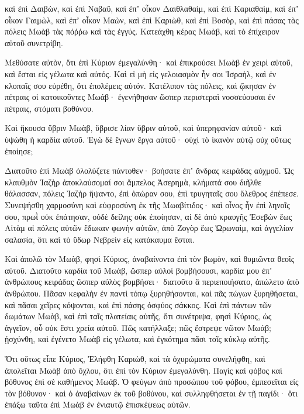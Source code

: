 {καὶ ἐπὶ Δαιβὼν, καὶ ἐπὶ Ναβαῦ, καὶ ἐπʼ οἶκον Δαιθλαθαὶμ,
καὶ ἐπὶ Καριαθαὶμ, καὶ ἐπʼ οἶκον Γαιμὼλ, καὶ ἐπʼ οἶκον Μαὼν,
καὶ ἐπὶ Καριὼθ, καὶ ἐπὶ Βοσὸρ, καὶ ἐπὶ πάσας τὰς πόλεις Μωὰβ τὰς πόῤῥω καὶ τὰς ἐγγύς.
Κατεάχθη κέρας Μωὰβ, καὶ τὸ ἐπίχειρον αὐτοῦ συνετρίβη.
\par }{\PP {}Μεθύσατε αὐτὸν, ὅτι ἐπὶ Κύριον ἐμεγαλύνθη· καὶ ἐπικρούσει Μωὰβ ἐν χειρὶ αὐτοῦ, καὶ ἔσται εἰς γέλωτα καὶ αὐτός.
Καὶ εἰ μὴ εἰς γελοιασμὸν ἦν σοι Ἰσραὴλ, καὶ ἐν κλοπαῖς σου εὑρέθη, ὅτι ἐπολέμεις αὐτόν.
Κατέλιπον τὰς πόλεις, καὶ ᾤκησαν ἐν πέτραις οἱ κατοικοῦντες Μωάβ· ἐγενήθησαν ὥσπερ περιστεραὶ νοσσεύουσαι ἐν πέτραις, στόματι βοθύνου.
\par }{\PP {}Καὶ ἤκουσα ὕβριν Μωὰβ, ὕβρισε λίαν ὕβριν αὐτοῦ, καὶ ὑπερηφανίαν αὐτοῦ· καὶ ὑψώθη ἡ καρδία αὐτοῦ.
Ἐγὼ δὲ ἔγνων ἔργα αὐτοῦ· οὐχὶ τὸ ἱκανὸν αὐτῷ οὐχ οὕτως ἐποίησε;
\par }{\PP {}Διατοῦτο ἐπὶ Μωὰβ ὀλολύζετε πάντοθεν· βοήσατε ἐπʼ ἄνδρας κειράδας αὐχμοῦ.
Ὡς κλαυθμὸν Ἰαζὴρ ἀποκλαύσομαί σοι ἄμπελος Ἀσερημὰ, κλήματά σου διῆλθε θάλασσαν, πόλεις Ἰαζὴρ ἥψαντο, ἐπὶ ὀπώραν σου, ἐπὶ τρυγηταῖς σου ὄλεθρος ἐπέπεσε.
Συνεψήσθη χαρμοσύνη καὶ εὐφροσύνη ἐκ τῆς Μωαβίτιδος· καὶ οἶνος ἦν ἐπὶ ληνοῖς σου, πρωῒ οὐκ ἐπάτησαν, οὐδὲ δείλης οὐκ ἐποίησαν,
αἱ δὲ ἀπὸ κραυγῆς Ἐσεβὼν ἕως Αἰτὰμ αἱ πόλεις αὐτῶν ἔδωκαν φωνὴν αὐτῶν, ἀπὸ Ζογὸρ ἕως Ὠρωναὶμ, καὶ ἀγγελίαν σαλασία, ὅτι καὶ τὸ ὕδωρ Νεβρεὶν εἰς κατάκαυμα ἔσται.
\par }{\PP {}Καὶ ἀπολῶ τὸν Μωὰβ, φησὶ Κύριος, ἀναβαίνοντα ἐπὶ τὸν βωμὸν, καὶ θυμιῶντα θεοῖς αὐτοῦ.
Διατοῦτο καρδία τοῦ Μωὰβ, ὥσπερ αὐλοὶ βομβήσουσι, καρδία μου ἐπʼ ἀνθρώπους κειράδας ὥσπερ αὐλὸς βομβήσει· διατοῦτο ἃ περιεποιήσατο, ἀπώλετο ἀπὸ ἀνθρώπου.
Πᾶσαν κεφαλὴν ἐν παντὶ τόπῳ ξυρηθήσονται, καὶ πᾶς πώγων ξυρηθήσεται, καὶ πᾶσαι χεῖρες κόψονται, καὶ ἐπὶ πάσης ὀσφύος σάκκος.
Καὶ ἐπὶ πάντων τῶν δωμάτων Μωὰβ, καὶ ἐπὶ ταῖς πλατείαις αὐτῆς, ὅτι συνέτριψα, φησὶ Κύριος, ὡς ἀγγεῖον, οὗ οὐκ ἔστι χρεία αὐτοῦ.
Πῶς κατήλλαξε; πῶς ἔστρεψε νῶτον Μωάβ; ᾐσχύνθη, καὶ ἐγένετο Μωὰβ εἰς γέλωτα, καὶ ἐγκότημα πᾶσι τοῖς κύκλῳ αὐτῆς.
\par }{\PP {}Ὅτι οὕτως εἶπε Κύριος,
Ἐλήφθη Καριὼθ, καὶ τὰ ὀχυρώματα συνελήφθη,
καὶ ἀπολεῖται Μωὰβ ἀπὸ ὄχλου, ὅτι ἐπὶ τὸν Κύριον ἐμεγαλύνθη.
Παγὶς καὶ φόβος καὶ βόθυνος ἐπὶ σὲ καθήμενος Μωάβ.
Ὁ φεύγων ἀπὸ προσώπου τοῦ φόβου, ἐμπεσεῖται εἰς τὸν βόθυνον· καὶ ὁ ἀναβαίνων ἐκ τοῦ βοθύνου, καὶ συλληφθήσεται ἐν τῇ παγίδι· ὅτι ἐπάξω ταῦτα ἐπὶ Μωὰβ ἐν ἐνιαυτῷ ἐπισκέψεως αὐτῶν.

}
